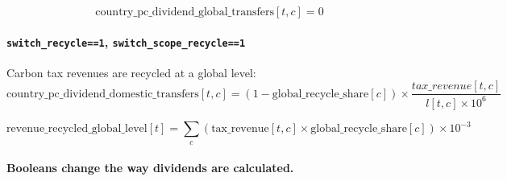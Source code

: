 \documentclass[
]{article}
\begin{document}
\begin{equation}
 \text{country\_pc\_dividend\_global\_transfers}[t,c] = 0
\end{equation}


\paragraph{\texorpdfstring{\texttt{switch\_recycle==1},
\texttt{switch\_scope\_recycle==1}}{switch\_recycle==1, switch\_scope\_recycle==1}}\label{switch_recycle1-switch_scope_recycle1}

Carbon tax revenues are recycled at a global level:
\begin{equation}
\text{country\_pc\_dividend\_domestic\_transfers}[t,c] = (1 - \text{global\_recycle\_share}[c]) \times \frac{tax\_revenue[t,c]}{l[t,c] \times 10^6} 
\end{equation}

\begin{equation}
\text{revenue\_recycled\_global\_level}[t] = \sum_c(\text{tax\_revenue}[t,c] \times \text{global\_recycle\_share}[c]) \times 10^{-3}
\end{equation}


\paragraph{\texorpdfstring{\textbf{Booleans change the way dividends are calculated}.}{Booleans change the way dividends are calculated.}}\label{booleans-change-the-way-dividends-are-calculated.}
\end{document}
